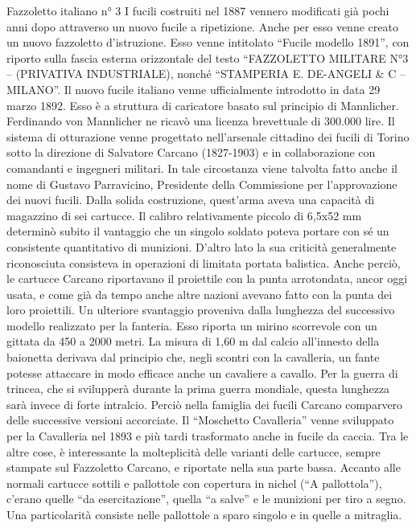 Fazzoletto italiano n° 3
  I fucili costruiti nel 1887 vennero modificati già pochi anni dopo attraverso un nuovo fucile a ripetizione. Anche per esso venne creato un nuovo fazzoletto d’istruzione. Esso venne intitolato “Fucile modello 1891”, con riporto sulla fascia    esterna    orizzontale   del   testo   “FAZZOLETTO MILITARE N°3 – (PRIVATIVA INDUSTRIALE), nonché “STAMPERIA E. DE-ANGELI \& C – MILANO”.    Il nuovo fucile italiano venne ufficialmente introdotto in data 29 marzo 1892. Esso è a struttura di caricatore basato sul principio di Mannlicher. Ferdinando von Mannlicher ne ricavò una licenza brevettuale di 300.000 lire. Il sistema di otturazione venne progettato nell’arsenale cittadino dei fucili di Torino sotto la direzione di Salvatore Carcano (1827-1903) e in collaborazione con comandanti e ingegneri militari. In tale circostanza viene talvolta fatto anche il nome di Gustavo Parravicino, Presidente della Commissione per l’approvazione dei nuovi fucili.   Dalla solida costruzione, quest’arma aveva una capacità di magazzino di sei cartucce. Il calibro relativamente piccolo di 6,5x52 mm determinò subito il vantaggio che un singolo soldato poteva portare con sé un consistente quantitativo di munizioni. D’altro lato la sua criticità generalmente riconosciuta consisteva in operazioni di limitata portata balistica. Anche perciò, le cartucce Carcano riportavano il proiettile con la punta arrotondata, ancor oggi usata, e come già da tempo anche altre nazioni avevano fatto con la punta dei loro proiettili.  
   Un ulteriore svantaggio proveniva dalla lunghezza del successivo modello realizzato per la fanteria. Esso riporta un mirino scorrevole con un gittata da 450 a 2000 metri. La misura di 1,60 m dal calcio all’innesto della baionetta derivava dal principio che, negli scontri con la cavalleria, un fante potesse attaccare in modo efficace anche un cavaliere a cavallo. Per la guerra di trincea, che si svilupperà durante la prima guerra mondiale, questa lunghezza sarà invece di forte intralcio. 
  Perciò nella famiglia dei fucili Carcano comparvero delle successive versioni accorciate. Il “Moschetto Cavalleria” venne sviluppato per la Cavalleria nel 1893 e più tardi trasformato anche in fucile da caccia. 
   Tra le altre cose, è interessante la molteplicità delle varianti delle cartucce, sempre stampate sul Fazzoletto Carcano, e riportate nella sua parte bassa.  Accanto alle normali cartucce sottili e pallottole con copertura in nichel (“A pallottola”), c’erano quelle “da esercitazione”, quella “a salve” e le munizioni per tiro a segno. Una particolarità consiste nelle pallottole a sparo singolo e in quelle a mitraglia.
